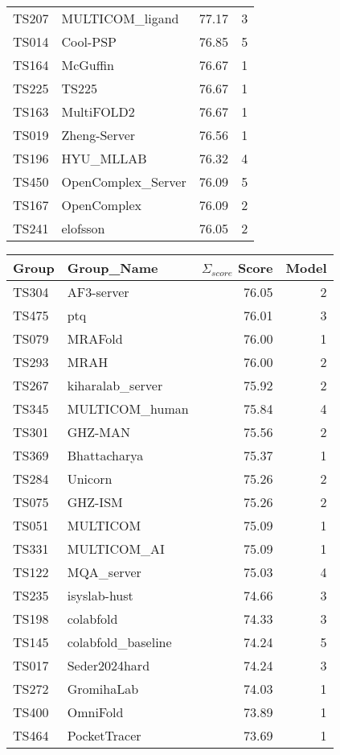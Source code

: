 \begin{table*}[ht]
\begin{minipage}[t]{0.48\textwidth}
\begin{tabular}{llrr}
TS207 & MULTICOM\_ligand & 77.17 & 3 \\ 
TS014 & Cool-PSP & 76.85 & 5 \\ 
TS164 & McGuffin & 76.67 & 1 \\ 
TS225 & TS225 & 76.67 & 1 \\ 
TS163 & MultiFOLD2 & 76.67 & 1 \\ 
TS019 & Zheng-Server & 76.56 & 1 \\ 
TS196 & HYU\_MLLAB & 76.32 & 4 \\ 
TS450 & OpenComplex\_Server & 76.09 & 5 \\ 
TS167 & OpenComplex & 76.09 & 2 \\ 
TS241 & elofsson & 76.05 & 2 \\ 
\bottomrule
\end{tabular}
\end{minipage}
\hfill
\begin{minipage}[t]{0.48\textwidth}
\centering
\begin{tabular}{llrr}
\toprule
Group & Group\_Name & $\Sigma_{score}$ Score & Model \\ 
\midrule
TS304 & AF3-server & 76.05 & 2 \\ 
TS475 & ptq & 76.01 & 3 \\ 
TS079 & MRAFold & 76.00 & 1 \\ 
TS293 & MRAH & 76.00 & 2 \\ 
TS267 & kiharalab\_server & 75.92 & 2 \\ 
TS345 & MULTICOM\_human & 75.84 & 4 \\ 
TS301 & GHZ-MAN & 75.56 & 2 \\ 
TS369 & Bhattacharya & 75.37 & 1 \\ 
TS284 & Unicorn & 75.26 & 2 \\ 
TS075 & GHZ-ISM & 75.26 & 2 \\ 
TS051 & MULTICOM & 75.09 & 1 \\ 
TS331 & MULTICOM\_AI & 75.09 & 1 \\ 
TS122 & MQA\_server & 75.03 & 4 \\ 
TS235 & isyslab-hust & 74.66 & 3 \\ 
TS198 & colabfold & 74.33 & 3 \\ 
TS145 & colabfold\_baseline & 74.24 & 5 \\ 
TS017 & Seder2024hard & 74.24 & 3 \\ 
TS272 & GromihaLab & 74.03 & 1 \\ 
TS400 & OmniFold & 73.89 & 1 \\ 
TS464 & PocketTracer & 73.69 & 1 \\ 

\end{tabular}
\end{minipage}
\end{table*}
